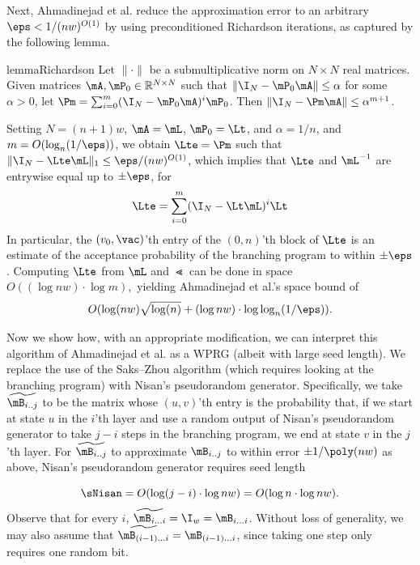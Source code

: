 \documentclass[11pt]{article}
\newcommand{\R}{{\mathbb R}}
\begin{document}
   Next, %
Ahmadinejad  %
et al. reduce the approximation error to an arbitrary $\eps<1/(nw)^{O(1)}$ by using preconditioned Richardson iterations, as captured by the following lemma. %
   
   
    \begin{restatable}{lemma}{Richardson}
    \label{lem:richardson}
    Let $\|\cdot\|$ be a submultiplicative norm on $N\times N$ real matrices. Given matrices $\mA,\mP_0\in \R^{N\times N}$ such that $\|\I_N-\mP_0\mA\|\leq \alpha$ for some $\alpha >0$, let $\Pm=\sum_{i=0}^m(\I_N-\mP_0\mA)^i\mP_0$. Then $\|\I_N-\Pm \mA\|\leq \alpha^{m+1}$.
    \end{restatable}
    
    Setting $N=(n+1)w$, $\mA=\mL$, $\mP_0=\Lt$, and $\alpha=1/n$, and
    $m=O(\log_{n}(1/\eps))$, we obtain $\Lte=\Pm$ such that
    $\|\I_N-\Lte \mL\|_1\leq \eps/(nw)^{O(1)}$, which implies that $\Lte$ and $\mL^{-1}$ are entrywise equal up to $\pm \eps$, for
    \begin{equation}
        \Lte = \sum_{i=0}^m(\I_N-\Lt\mL)^i\Lt \label{eqn:iterated_L}
    \end{equation}
    In particular, the $(v_0,\vac)$'th entry of the $(0,n)$'th block of $\Lte$ is an estimate of the acceptance probability of the branching program to within $\pm \eps$.  Computing $\Lte$ from $\mL$ and $\Lt$ 
    can be done in space $O((\log nw)\cdot \log m),$ yielding 
%
Ahmadinejad  %
et al.'s space bound of 
    $$O(\log(nw)\sqrt{\log(n)} + (\log nw)\cdot \log \log_{n}(1/\eps)).$$
    
Now we show how, with an appropriate modification, we can interpret this algorithm of
%
Ahmadinejad  %
et al. as a WPRG (albeit with large seed length).
    We replace the use of the Saks--Zhou algorithm (which requires looking at the branching program) with Nisan's pseudorandom generator.  Specifically, we take 
    $\widetilde{\mB_{i .. j}}$ to be the matrix whose $(u,v)$'th entry
    is the probability that, if we start at state $u$ in %
    the $i$'th layer and
    use a random output of Nisan's pseudorandom generator to take $j-i$ steps in the branching program, we end at state $v$ in the $j$'th layer.  For 
    $\widetilde{\mB_{i .. j}}$ to approximate $\mB_{i .. j}$ to within error $\pm 1/\poly(nw)$ as above, Nisan's pseudorandom generator requires seed length 
    
    $$\sNisan = O(\log(j-i)\cdot \log nw) = O(\log n\cdot \log nw).$$
    Observe that for every $i$, $\widetilde{\mB_{i\ldots i}} = \I_w = \mB_{i\ldots i}$. Without loss of generality, we may also assume that
    $\widetilde{\mB_{(i-1)\ldots i}}=\mB_{(i-1)\ldots i}$, since taking one step only requires one random bit.  
    
\end{document}
